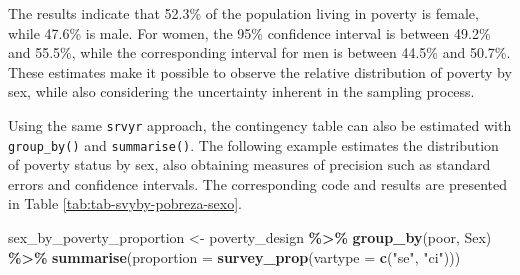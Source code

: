 \documentclass[
  english,
  12pt,
]{book}
\newenvironment{Shaded}{\begin{snugshade}}{\end{snugshade}}
\newcommand{\AttributeTok}[1]{\textcolor[rgb]{0.13,0.29,0.53}{#1}}
\newcommand{\FunctionTok}[1]{\textcolor[rgb]{0.13,0.29,0.53}{\textbf{#1}}}
\newcommand{\NormalTok}[1]{#1}
\newcommand{\OtherTok}[1]{\textcolor[rgb]{0.56,0.35,0.01}{#1}}
\newcommand{\SpecialCharTok}[1]{\textcolor[rgb]{0.81,0.36,0.00}{\textbf{#1}}}
\newcommand{\StringTok}[1]{\textcolor[rgb]{0.31,0.60,0.02}{#1}}
\begin{document}
The results indicate that 52.3\% of the population living in poverty is female, while 47.6\% is male. For women, the 95\% confidence interval is between 49.2\% and 55.5\%, while the corresponding interval for men is between 44.5\% and 50.7\%. These estimates make it possible to observe the relative distribution of poverty by sex, while also considering the uncertainty inherent in the sampling process.

Using the same \texttt{srvyr} approach, the contingency table can also be estimated with \texttt{group\_by()} and \texttt{summarise()}. The following example estimates the distribution of poverty status by sex, also obtaining measures of precision such as standard errors and confidence intervals. The corresponding code and results are presented in Table \ref{tab:tab-svyby-pobreza-sexo}.

\begin{Shaded}
\begin{Highlighting}[]
\NormalTok{sex\_by\_poverty\_proportion }\OtherTok{\textless{}{-}}\NormalTok{ poverty\_design }\SpecialCharTok{\%\textgreater{}\%}
  \FunctionTok{group\_by}\NormalTok{(poor, Sex) }\SpecialCharTok{\%\textgreater{}\%}
  \FunctionTok{summarise}\NormalTok{(}\AttributeTok{proportion =} \FunctionTok{survey\_prop}\NormalTok{(}\AttributeTok{vartype =} \FunctionTok{c}\NormalTok{(}\StringTok{"se"}\NormalTok{, }\StringTok{"ci"}\NormalTok{)))}
\end{Highlighting}
\end{Shaded}
\end{document}
